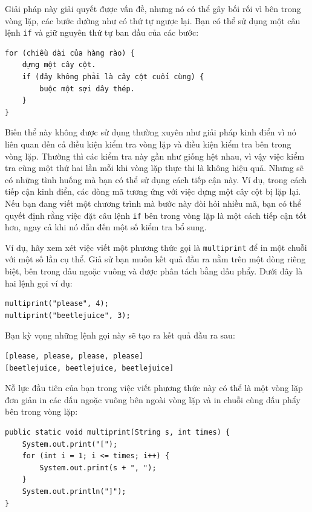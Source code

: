 Giải pháp này giải quyết được vấn đề, nhưng nó có thể gây bối rối vì bên trong vòng lặp, các bước dường như có thứ tự ngược lại. Bạn có thể sử dụng một câu lệnh \texttt{if} và giữ nguyên thứ tự ban đầu của các bước:

\begin{verbatim}
for (chiều dài của hàng rào) {
    dựng một cây cột.
    if (đây không phải là cây cột cuối cùng) {
        buộc một sợi dây thép.
    }
}
\end{verbatim}


Biến thể này không được sử dụng thường xuyên như giải pháp kinh điển vì nó liên quan đến cả điều kiện kiểm tra vòng lặp và điều kiện kiểm tra bên trong vòng lặp. Thường thì các kiểm tra này gần như giống hệt nhau, vì vậy việc kiểm tra cùng một thứ hai lần mỗi khi vòng lặp thực thi là không hiệu quả. Nhưng sẽ có những tình huống mà bạn có thể sử dụng cách tiếp cận này. Ví dụ, trong cách tiếp cận kinh điển, các dòng mã tương ứng với việc dựng một cây cột bị lặp lại. Nếu bạn đang viết một chương trình mà bước này đòi hỏi nhiều mã, bạn có thể quyết định rằng việc đặt câu lệnh \texttt{if} bên trong vòng lặp là một cách tiếp cận tốt hơn, ngay cả khi nó dẫn đến một số kiểm tra bổ sung.

Ví dụ, hãy xem xét việc viết một phương thức gọi là \texttt{multiprint} để in một chuỗi với một số lần cụ thể. Giả sử bạn muốn kết quả đầu ra nằm trên một dòng riêng biệt, bên trong dấu ngoặc vuông và được phân tách bằng dấu phẩy. Dưới đây là hai lệnh gọi ví dụ:

\begin{verbatim}
multiprint("please", 4);
multiprint("beetlejuice", 3);
\end{verbatim}


Bạn kỳ vọng những lệnh gọi này sẽ tạo ra kết quả đầu ra sau:
 
\begin{verbatim}
[please, please, please, please] 
[beetlejuice, beetlejuice, beetlejuice] 
\end{verbatim}


Nỗ lực đầu tiên của bạn trong việc viết phương thức này có thể là một vòng lặp đơn giản in các dấu ngoặc vuông bên ngoài vòng lặp và in chuỗi cùng dấu phẩy bên trong vòng lặp:

\begin{verbatim}
public static void multiprint(String s, int times) {
    System.out.print("[");
    for (int i = 1; i <= times; i++) {
        System.out.print(s + ", ");
    }
    System.out.println("]");
}
\end{verbatim}



